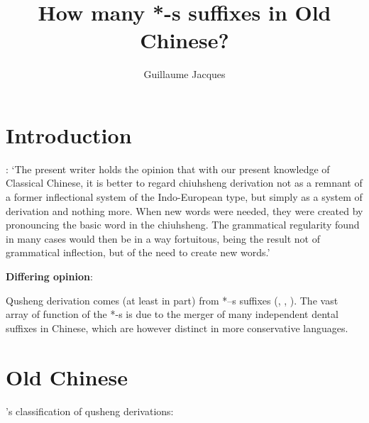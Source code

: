 \documentclass[oldfontcommands,oneside,a4paper,11pt]{article}
\newcommand{\ipa}[1]{{\phon \mbox{#1}}} %
\begin{document}
 
\title{How many *-s suffixes in Old Chinese? }
\author{Guillaume Jacques}
\maketitle
 


\section{Introduction}
 \citet[262]{downer59}:
`The present writer holds the opinion that with our present knowledge of Classical Chinese, it is better to regard chiuhsheng derivation not as a remnant of a former inflectional system of the Indo-European type, but simply as a system of derivation and nothing more. When new words were needed, they were created by pronouncing the basic word in the chiuhsheng. The grammatical regularity found in many cases would then be in a way fortuitous, being the result not of grammatical inflection, but of the need to create new words.'

\textbf{Differing opinion}:

Qusheng derivation comes (at least in part) from *\ipa{--s} suffixes (\citealt{haudricourt54chinois}, \citealt{forrest60occlusives}, \citealt{sagart99roc, bs14oc}). The vast array of function of the *-s is due to the merger of many independent dental suffixes in Chinese, which are however distinct in more conservative languages.



\section{Old Chinese}
\citet{downer59}'s classification of qusheng derivations:
\end{document}
